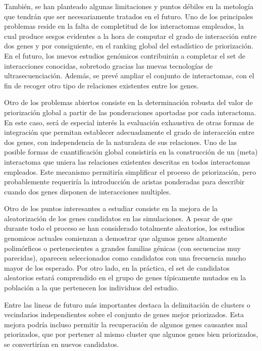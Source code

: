 \medskip
También, se han planteado algunas limitaciones y puntos débiles en la metología que tendrán que ser necesariamente tratados en el futuro. Uno de los principales problemas reside en la falta de completitud de los interactomas empleados, la cual produce sesgos evidentes a la hora de computar el grado de interacción entre dos genes y por consiguiente, en el ranking global del estadístico de priorización. En el futuro, los nuevos estudios genómicos contribuirán a completar el set de interacciones conocidas, sobretodo gracias las nuevas tecnologías de ultrasecuenciación. Además, se prevé ampliar el conjunto de interactomas, con el fin de recoger otro tipo de relaciones existentes entre los genes. 

\medskip
Otro de los problemas abiertos consiste en la determinación robusta del valor de priorización global a partir de las ponderaciones aportadas por cada interactoma. En este caso, será de especial interés la evaluación exhaustiva de otras formas de integración que permitan establecer adecuadamente el grado de interacción entre dos genes, con independencia de la naturaleza de sus relaciones. Uno de las posible formas de cuantificación global consistiría en la construcción de un (meta) interactoma que uniera las relaciones existentes descritas en todos interactomas empleados. Este mecanismo permitiría simplificar el proceso de priorización, pero probablemente requeriría la introducción de aristas ponderadas para describir cuando dos genes disponen de interacciones multiples.

\medskip
Otro de los puntos interesantes a estudiar consiste en la mejora de la aleatorización de los genes candidatos en las simulaciones. A pesar de que durante todo el proceso se han considerado totalmente aleatorios, los estudios genomicos actuales comienzan a demostrar que algunos genes altamente polimórficos o pertenecientes a grandes familias génicas (con secuencias muy parecidas), aparecen seleccionados como candidatos con una frecuencia mucho mayor de los esperado. Por otro lado, en la práctica, el set de candidatos aleatorios estará comprendido en el grupo de genes típicamente mutados en la población a la que pertenecen los individuos del estudio. 

\medskip
Entre las lineas de futuro más importantes destaca la delimitación de clusters o vecindarios independientes sobre el conjunto de genes mejor priorizados. Esta mejora podría incluso permitir la recuperación de algunos genes causantes mal priorizados, que por pertener al mismo cluster que algunos genes bien priorizados, se convertirían en nuevos candidatos.

